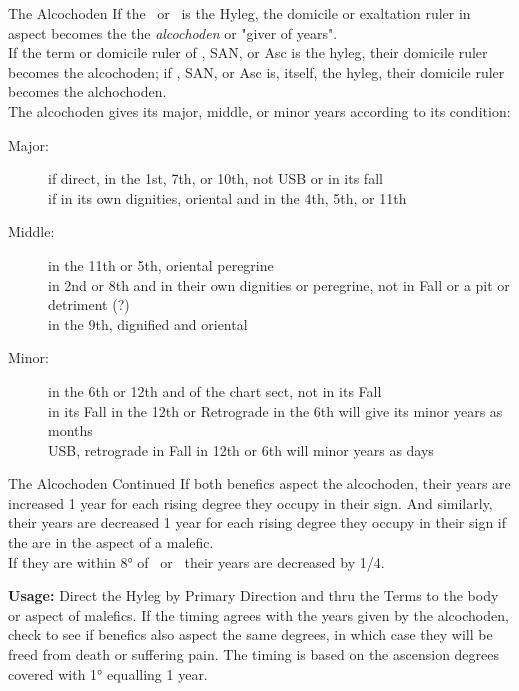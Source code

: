 \begin{frame}[t]{The Alcochoden}
If the \Sun\ or \Moon\ is the Hyleg, the domicile or exaltation ruler in aspect becomes the the \textsl{alcochoden} or "giver of years". \\

\vspace{0.2cm}
If the term or domicile ruler of \Fortune, SAN, or Asc is the hyleg, their domicile ruler becomes the alcochoden; if \Fortune, SAN, or Asc is, itself, the hyleg, their domicile ruler becomes the alchochoden.\\

\vspace{0.2cm}
The alcochoden gives its major, middle, or minor years according to its condition:
\begin{description}
\item[Major:] if direct, in the 1st, 7th, or 10th, not USB or in its fall \\
	if in its own dignities, oriental and in the 4th, 5th, or 11th
\item[Middle:] in the 11th or 5th, oriental peregrine \\
	in 2nd or 8th and in their own dignities or peregrine, not in Fall or a pit or detriment (?) \\
	in the 9th, dignified and oriental
\item[Minor:] in the 6th or 12th and of the chart sect, not in its Fall \\
	in its Fall in the 12th or Retrograde in the 6th will give its minor years as months \\
	USB, retrograde in Fall in 12th or 6th will minor years as days
	
\end{description}

\end{frame}
\begin{frame}[t]{The Alcochoden Continued}
If both benefics aspect the alcochoden, their years are increased 1 year for each rising degree they occupy in their sign. And similarly, their years are decreased 1 year for each rising  degree they occupy in their sign if the are in the aspect of a malefic. \\

\vspace{0.25cm}
If they are within 8° of \NorthNode\ or \SouthNode\ their years are decreased by 1/4.

\textbf{Usage:}
Direct the Hyleg by Primary Direction and thru the Terms to the body or aspect of malefics. If the timing agrees with the years given by the alcochoden, check to see if benefics also aspect the same degrees, in which case they will be freed from death or suffering pain. The timing is based on the ascension degrees covered with 1° equalling 1 year.

\end{frame}

